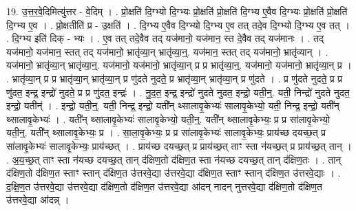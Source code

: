 \documentclass[17pt]{extarticle}
\begin{document}
19. उ॒त्त॒र॒वे॒दिमित्यु॑त्तर - वे॒दिम् । . प्रो॒क्षति॑ दि॒ग्भ्यो दि॒ग्भ्यः प्रो॒क्षति॑ प्रो॒क्षति॑ दि॒ग्भ्य ए॒वैव दि॒ग्भ्यः प्रो॒क्षति॑ प्रो॒क्षति॑ दि॒ग्भ्य ए॒व । . प्रो॒क्षतीति॑ प्र - उ॒क्षति॑ । . दि॒ग्भ्य ए॒वैव दि॒ग्भ्यो दि॒ग्भ्य ए॒व तत् तदे॒व दि॒ग्भ्यो दि॒ग्भ्य ए॒व तत् । . दि॒ग्भ्य इति॑ दिक् - भ्यः । . ए॒व तत् तदे॒वैव तद् यज॑मानो॒ यज॑मान॒ स्त दे॒वैव तद् यज॑मानः । . तद् यज॑मानो॒ यज॑मान॒ स्तत् तद् यज॑मानो॒ भ्रातृ॑व्या॒न् भ्रातृ॑व्या॒न्॒. यज॑मान॒ स्तत् तद् यज॑मानो॒ भ्रातृ॑व्यान् । . यज॑मानो॒ भ्रातृ॑व्या॒न् भ्रातृ॑व्या॒न्॒. यज॑मानो॒ यज॑मानो॒ भ्रातृ॑व्या॒न् प्र प्र भ्रातृ॑व्या॒न्॒. यज॑मानो॒ यज॑मानो॒ भ्रातृ॑व्या॒न् प्र । . भ्रातृ॑व्या॒न् प्र प्र भ्रातृ॑व्या॒न् भ्रातृ॑व्या॒न् प्र णु॑दते नुदते॒ प्र भ्रातृ॑व्या॒न् भ्रातृ॑व्या॒न् प्र णु॑दते । . प्र णु॑दते नुदते॒ प्र प्र णु॑दत॒ इन्द्र॒ इन्द्रो॑ नुदते॒ प्र प्र णु॑दत॒ इन्द्रः॑ । . नु॒द॒त॒ इन्द्र॒ इन्द्रो॑ नुदते नुदत॒ इन्द्रो॒ यती॒न्॒. यती॒ निन्द्रो॑ नुदते नुदत॒ इन्द्रो॒ यतीन्॑ । . इन्द्रो॒ यती॒न्॒. यती॒ निन्द्र॒ इन्द्रो॒ यती᳚न् थ्सालावृ॒केभ्यः॑ सालावृ॒केभ्यो॒ यती॒ निन्द्र॒ इन्द्रो॒ यती᳚न् थ्सालावृ॒केभ्यः॑ । . यती᳚न् थ्सालावृ॒केभ्यः॑ सालावृ॒केभ्यो॒ यती॒न्॒. यती᳚न् थ्सालावृ॒केभ्यः॒ प्र प्र सा॑लावृ॒केभ्यो॒ यती॒न्॒. यती᳚न् थ्सालावृ॒केभ्यः॒ प्र । . सा॒ला॒वृ॒केभ्यः॒ प्र प्र सा॑लावृ॒केभ्यः॑ सालावृ॒केभ्यः॒ प्राय॑च्छ दयच्छ॒त् प्र सा॑लावृ॒केभ्यः॑ सालावृ॒केभ्यः॒ प्राय॑च्छत् । . प्राय॑च्छ दयच्छ॒त् प्र प्राय॑च्छ॒त् ताꣳ स्ता न॑यच्छ॒त् प्र प्राय॑च्छ॒त् तान् । . अ॒य॒च्छ॒त् ताꣳ स्ता न॑यच्छ दयच्छ॒त् तान् द॑क्षिण॒तो द॑क्षिण॒त स्ता न॑यच्छ दयच्छ॒त् तान् द॑क्षिण॒तः । . तान् द॑क्षिण॒तो द॑क्षिण॒त स्ताꣳ स्तान् द॑क्षिण॒त उ॑त्तरवे॒द्या उ॑त्तरवे॒द्या द॑क्षिण॒त स्ताꣳ स्तान् द॑क्षिण॒त उ॑त्तरवे॒द्याः । . द॒क्षि॒ण॒त उ॑त्तरवे॒द्या उ॑त्तरवे॒द्या द॑क्षिण॒तो द॑क्षिण॒त उ॑त्तरवे॒द्या आ॑दन् नादन् नुत्तरवे॒द्या द॑क्षिण॒तो द॑क्षिण॒त उ॑त्तरवे॒द्या आ॑दन्न् । \newline
\end{document}
